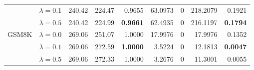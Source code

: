 \begin{table}[t]
{\begin{tabular}{l l rrrrrrr}
 & $\lambda{=}0.1$ & 240.42 & 224.47 & 0.9655 & 63.0973 & \cellcolor{cyan!12} $0$ & 218.2079 & 0.1921 \\
 & $\lambda{=}0.5$ & 240.42 & 224.99 & \textbf{0.9661} & 62.4935 & \cellcolor{cyan!12} $0$ & 216.1197 & \textbf{0.1794} \\
\midrule
GSM8K & $\lambda{=}0.0$ & 269.06 & 251.07 & 1.0000 & 17.9976 & \cellcolor{cyan!12} $0$ & 17.9976 & 0.1352 \\
 & $\lambda{=}0.1$ & 269.06 & 272.59 & \textbf{1.0000} & 3.5224 & \cellcolor{cyan!12} $0$ & 12.1813 & \textbf{0.0047} \\
 & $\lambda{=}0.5$ & 269.06 & 272.33 & 1.0000 & 3.2676 & \cellcolor{cyan!12} $0$ & 11.3001 & 0.0055 \\
\bottomrule
\end{tabular}}
\end{table}